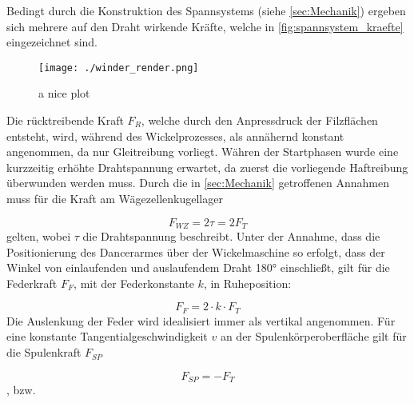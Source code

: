 Bedingt durch die Konstruktion des Spannsystems (siehe \autoref{sec:Mechanik}) ergeben sich mehrere auf den Draht wirkende Kräfte, welche in \autoref{fig:spannsystem_kraefte} eingezeichnet sind.
\begin{figure}[H]
    \centering
    \texttt{[image: ./winder\_render.png]}
    \caption{a nice plot}
    \label{fig:spannsystem_kraefte}
\end{figure}
Die rücktreibende Kraft $F_R$, welche durch den Anpressdruck der Filzflächen entsteht, wird, während des Wickelprozesses, als annähernd konstant angenommen, da nur Gleitreibung vorliegt. Währen der Startphasen wurde eine kurzzeitig erhöhte Drahtspannung erwartet, da zuerst die vorliegende Haftreibung überwunden werden muss. Durch die in \autoref{sec:Mechanik} getroffenen Annahmen muss für die Kraft am Wägezellenkugellager

\begin{equation}
    \label{eq:wz_kraft}
    F_{WZ} = 2  \tau = 2  F_T
\end{equation}
gelten, wobei $\tau$ die Drahtspannung beschreibt. Unter der Annahme, dass die Positionierung des Dancerarmes über der Wickelmaschine so erfolgt, dass der Winkel von einlaufenden und auslaufendem Draht 180° einschließt, gilt für die Federkraft $F_F$, mit der Federkonstante $k$, in Ruheposition:

\begin{equation}
    F_F = 2 \cdot k  \cdot F_T
\end{equation}
Die Auslenkung der Feder wird idealisiert immer als vertikal angenommen. Für eine konstante Tangentialgeschwindigkeit $v$ an der Spulenkörperoberfläche gilt für die Spulenkraft $F_{SP}$

\begin{equation}
    F_{SP} = -F_T
\end{equation}
, bzw.

